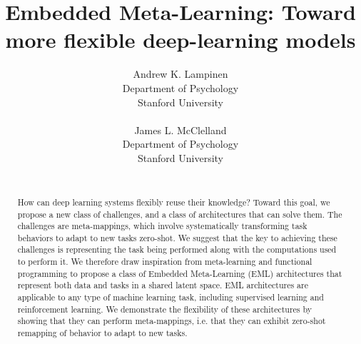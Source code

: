 \documentclass{article}
\begin{document}
\title{Embedded Meta-Learning: Toward more flexible deep-learning models}
\author{%
Andrew K. Lampinen\\
Department of Psychology\\
Stanford University\\
\\
\And
James L. McClelland\\
Department of Psychology\\
Stanford University\\
\\
}
\date{}
\maketitle

\begin{abstract}
How can deep learning systems flexibly reuse their knowledge? Toward this goal, we propose a new class of challenges, and a class of architectures that can solve them. The challenges are meta-mappings, which involve systematically transforming task behaviors to adapt to new tasks zero-shot. We suggest that the key to achieving these challenges is representing the task being performed along with the computations used to perform it. We therefore draw inspiration from meta-learning and functional programming to propose a class of Embedded Meta-Learning (EML) architectures that represent both data and tasks in a shared latent space. EML architectures are applicable to any type of machine learning task, including supervised learning and reinforcement learning. We demonstrate the flexibility of these architectures by showing that they can perform meta-mappings, i.e. that they can exhibit zero-shot remapping of behavior to adapt to new tasks. 
\end{abstract}
\end{document}
